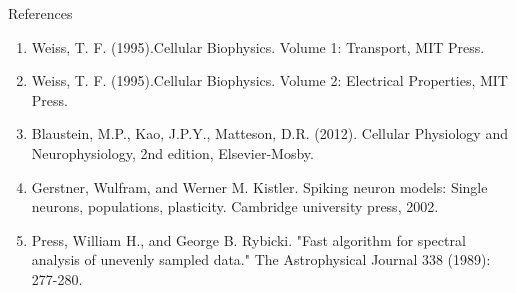 \documentclass{beamer}
\begin{document}
\begin{frame}{References}
\begin{enumerate}
\item Weiss, T. F. (1995).Cellular Biophysics. Volume 1: Transport, MIT Press.
\item Weiss, T. F. (1995).Cellular Biophysics. Volume 2: Electrical Properties, MIT Press.
\item Blaustein, M.P., Kao, J.P.Y., Matteson, D.R. (2012). Cellular Physiology and Neurophysiology, 2nd edition, Elsevier-Mosby. 
\item Gerstner, Wulfram, and Werner M. Kistler. Spiking neuron models: Single neurons, populations, plasticity. Cambridge university press, 2002.
\item Press, William H., and George B. Rybicki. "Fast algorithm for spectral analysis of unevenly sampled data." The Astrophysical Journal 338 (1989): 277-280.
\end{enumerate}
\end{frame}
\end{document}
